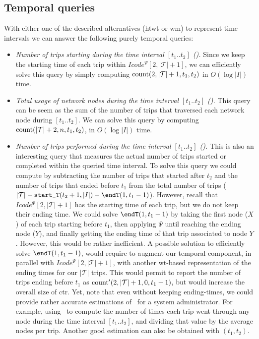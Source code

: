 	\subsection{Temporal queries}
	\label{sec:tq}
	With either one of the described alternatives (\gls{htwt} or \gls{wm}) to represent time intervals we can answer the following purely temporal queries:
	
	\begin{itemize}

	\item {\em Number of trips starting during the time interval $[t_1..t_2]$ (\startT).} Since we keep the
	starting time of each trip within $Icode^{\Psi}[2,|\mathcal{T}|+1]$, we can efficiently solve this query 
	by simply computing $\operatorname{count}(2,|\mathcal{T}|+1,t_1,t_2)$ in $O(\log|I|)$ time.

	\item  {\em Total usage of network nodes during the time interval $[t_1..t_2]$ (\loadT).} This query
	can be seem as the sum of the number of trips that traversed each network node during $[t_1..t_2]$.
	We can solve this query by computing $\operatorname{count}(|\mathcal{T}|+2,n,t_1,t_2)$, in $O(\log|I|)$ time.

	\item {\em Number of trips performed during the time interval $[t_1..t_2]$ (\tripT).} This is also an interesting query that measures the actual number of trips started or completed within the queried time interval. 
	To solve this query
	we could compute {\em \tripT} by subtracting the number of trips that started after $t_2$  and the number of trips that ended 	before $t_1$ from the total number of trips ($|\mathcal{T}| - \startT(t_2+1,|I|) - \endT(1,t_1-1)$). 
	However, recall that
	$Icode^{\Psi}[2,|\mathcal{T}|+1]$ has the starting time of each trip, but we do not keep their ending time.
	We could solve $\endT(1,t_1-1)$ by taking the first node ($X$) of each trip starting
	before $t_1$, then applying $\Psi$ until reaching the ending node ($Y$), and finally getting the ending
	time of that trip associated to node $Y$. However, this would be rather inefficient.
	A possible solution to efficiently solve $\endT(1,t_1-1)$, would require to augment our temporal
	component, in parallel with $Icode^{\Psi}[2,|\mathcal{T}|+1]$, with another \gls{wt}-based representation of the 
	ending times for our $|\mathcal{T}|$ trips. This would permit to report the number of trips
	ending before $t_1$ as $\operatorname{count}'(2,|\mathcal{T}|+1,0,t_1-1)$, but would increase the overall size of \gls{ctr}.
	Yet, note that even without keeping ending-times, we could 
	provide rather accurate estimations of \tripT\ for a system administrator. For example, using \loadT\
	to compute the number of times each trip went through any node during the time interval $[t_1..t_2]$, 
	and dividing that value by the average nodes per trip. Another good estimation can also be obtained with \startT$(t_1,t_2)$.



\end{itemize}
